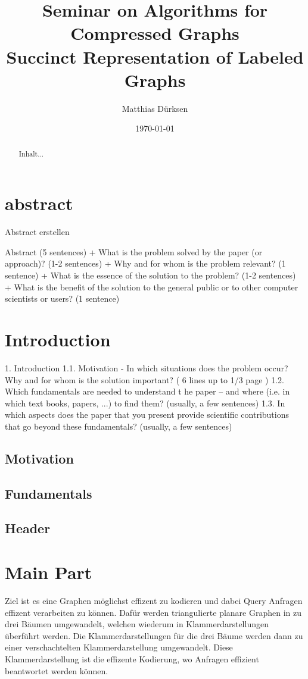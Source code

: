 \documentclass[a4paper]{scrartcl}
\title{Seminar on Algorithms for Compressed Graphs \\ Succinct Representation of Labeled Graphs}
\author{Matthias Dürksen}
\date{\today}
\begin{document}
\maketitle

\section{abstract}
Abstract erstellen
\begin{abstract}
	Inhalt...
\end{abstract}
Abstract (5 sentences)
+ What is the problem solved by the paper (or approach)? (1-2 sentences)
+ Why and for whom is the problem relevant? (1 sentence)
+ What is the essence of the solution to the problem? (1-2 sentences)
+ What is the benefit of the solution to the general public
or to other computer scientists or users? (1 sentence)


\section{Introduction}\label{sec:introduction}

1. Introduction
1.1. Motivation
- In which situations does the problem occur? Why and for whom is the solution important?
( 6 lines up to 1/3 page )
1.2. Which fundamentals are needed to understand t he paper – and where (i.e. in which text
books, papers, ...) to find them? (usually, a few sentences)
1.3. In which aspects does the paper that you present provide scientific contributions that go
beyond these fundamentals? (usually, a few sentences)

\subsection{Motivation}

\subsection{Fundamentals}

\subsection{Header}





\section{Main Part}
Ziel ist es eine Graphen möglichst effizent zu kodieren und dabei Query Anfragen effizent verarbeiten zu können. Dafür werden triangulierte planare Graphen in zu drei Bäumen umgewandelt, welchen wiederum in Klammerdarstellungen überführt werden. Die Klammerdarstellungen für die drei Bäume werden dann zu einer verschachtelten Klammerdarstellung umgewandelt. Diese Klammerdarstellung ist die effizente Kodierung, wo Anfragen effizient beantwortet werden können.
\end{document}
